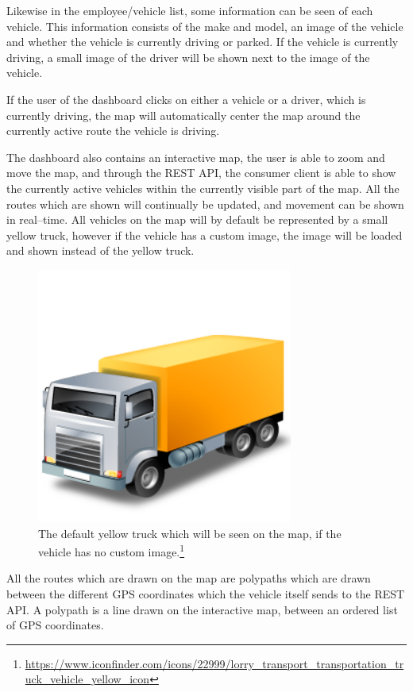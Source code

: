 Likewise in the employee/vehicle list, some information can be seen of each vehicle.
This information consists of the make and model, an image of the vehicle and whether the vehicle is currently driving or parked.
If the vehicle is currently driving, a small image of the driver will be shown next to the image of the vehicle.

If the user of the dashboard clicks on either a vehicle or a driver, which is currently driving, the map will automatically center the map around the currently active route the vehicle is driving.

\bigskip
The dashboard also contains an interactive map, the user is able to zoom and move the map, and through the REST API, the consumer client is able to show the currently active vehicles within the currently visible part of the map.
All the routes which are shown will continually be updated, and movement can be shown in real--time.
All vehicles on the map will by default be represented by a small yellow truck, however if the vehicle has a custom image, the image will be loaded and shown instead of the yellow truck.

\begin{figure}[h]
    \centering
    \includegraphics[width=0.75\textwidth]{img/Truck_Yellow.png}
    \caption{The default yellow truck which will be seen on the map, if the vehicle has no custom image.\footnote{\url{https://www.iconfinder.com/icons/22999/lorry_transport_transportation_truck_vehicle_yellow_icon}}}
    \label{fig:ConsumerClientYellowTruck}
\end{figure}

All the routes which are drawn on the map are polypaths which are drawn between the different GPS coordinates which the vehicle itself sends to the REST API.
A polypath is a line drawn on the interactive map, between an ordered list of GPS coordinates.


